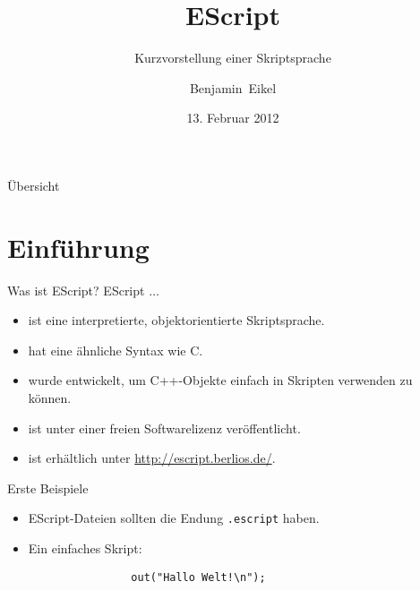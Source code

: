 \documentclass[ucs,9pt]{beamer}
\title{EScript}
\subtitle{Kurzvorstellung einer Skriptsprache}
\author{Benjamin~Eikel}
\date{13. Februar 2012}
\begin{document}
\maketitle

\begin{frame}{Übersicht}
\tableofcontents
\end{frame}

\section{Einführung}
\begin{frame}{Was ist EScript?}
EScript $\ldots$ \\[1em]
\begin{itemize}
	\addtolength{\itemsep}{\baselineskip}
	\item ist eine interpretierte, objektorientierte Skriptsprache.
	\item hat eine ähnliche Syntax wie C.
	\item wurde entwickelt, um C++-Objekte einfach in Skripten verwenden zu können.
	\item ist unter einer freien Softwarelizenz veröffentlicht.
	\item ist erhältlich unter \url{http://escript.berlios.de/}.
\end{itemize}
\end{frame}

\begin{frame}[fragile]{Erste Beispiele}
\begin{itemize}
	\addtolength{\itemsep}{\baselineskip}
	\item EScript-Dateien sollten die Endung \texttt{.escript} haben.
	\item Ein einfaches Skript:
			\begin{lstlisting}
				out("Hallo Welt!\n");
			\end{lstlisting}
\end{itemize}
\end{frame}
\end{document}

